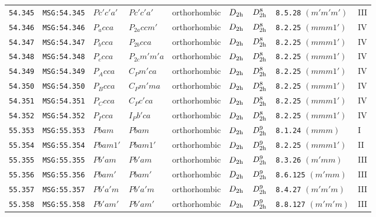 \documentclass[fleqn,10pt]{jsarticle}
\begin{document}
\begin{center}
\begin{longtable}{lllllllll}
\texttt{54.345} & \texttt{MSG:54.345} & $Pc'c'a'$ & $Pc'c'a'$ & orthorhombic & $D_{\rm 2h}$ & $D_{\rm 2h}^{8}$ & \texttt{8.5.28} $(m'm'm')$ & III \\
\texttt{54.346} & \texttt{MSG:54.346} & $P_{a}cca$ & $P_{2a}ccm'$ & orthorhombic & $D_{\rm 2h}$ & $D_{\rm 2h}^{8}$ & \texttt{8.2.25} $(mmm1')$ & IV \\
\texttt{54.347} & \texttt{MSG:54.347} & $P_{b}cca$ & $P_{2b}cca$ & orthorhombic & $D_{\rm 2h}$ & $D_{\rm 2h}^{8}$ & \texttt{8.2.25} $(mmm1')$ & IV \\
\texttt{54.348} & \texttt{MSG:54.348} & $P_{c}cca$ & $P_{2c}m'm'a$ & orthorhombic & $D_{\rm 2h}$ & $D_{\rm 2h}^{8}$ & \texttt{8.2.25} $(mmm1')$ & IV \\
\texttt{54.349} & \texttt{MSG:54.349} & $P_{A}cca$ & $C_{P}m'ca$ & orthorhombic & $D_{\rm 2h}$ & $D_{\rm 2h}^{8}$ & \texttt{8.2.25} $(mmm1')$ & IV \\
\texttt{54.350} & \texttt{MSG:54.350} & $P_{B}cca$ & $C_{P}m'ma$ & orthorhombic & $D_{\rm 2h}$ & $D_{\rm 2h}^{8}$ & \texttt{8.2.25} $(mmm1')$ & IV \\
\texttt{54.351} & \texttt{MSG:54.351} & $P_{C}cca$ & $C_{P}c'ca$ & orthorhombic & $D_{\rm 2h}$ & $D_{\rm 2h}^{8}$ & \texttt{8.2.25} $(mmm1')$ & IV \\
\texttt{54.352} & \texttt{MSG:54.352} & $P_{I}cca$ & $I_{P}b'ca$ & orthorhombic & $D_{\rm 2h}$ & $D_{\rm 2h}^{8}$ & \texttt{8.2.25} $(mmm1')$ & IV \\ \hline
\texttt{55.353} & \texttt{MSG:55.353} & $Pbam$ & $Pbam$ & orthorhombic & $D_{\rm 2h}$ & $D_{\rm 2h}^{9}$ & \texttt{8.1.24} $(mmm)$ & I \\
\texttt{55.354} & \texttt{MSG:55.354} & $Pbam1'$ & $Pbam1'$ & orthorhombic & $D_{\rm 2h}$ & $D_{\rm 2h}^{9}$ & \texttt{8.2.25} $(mmm1')$ & II \\
\texttt{55.355} & \texttt{MSG:55.355} & $Pb'am$ & $Pb'am$ & orthorhombic & $D_{\rm 2h}$ & $D_{\rm 2h}^{9}$ & \texttt{8.3.26} $(m'mm)$ & III \\
\texttt{55.356} & \texttt{MSG:55.356} & $Pbam'$ & $Pbam'$ & orthorhombic & $D_{\rm 2h}$ & $D_{\rm 2h}^{9}$ & \texttt{8.6.125} $(m'mm)$ & III \\
\texttt{55.357} & \texttt{MSG:55.357} & $Pb'a'm$ & $Pb'a'm$ & orthorhombic & $D_{\rm 2h}$ & $D_{\rm 2h}^{9}$ & \texttt{8.4.27} $(m'm'm)$ & III \\
\texttt{55.358} & \texttt{MSG:55.358} & $Pb'am'$ & $Pb'am'$ & orthorhombic & $D_{\rm 2h}$ & $D_{\rm 2h}^{9}$ & \texttt{8.8.127} $(m'm'm)$ & III \\

\end{longtable}
\end{center}
\end{document}

